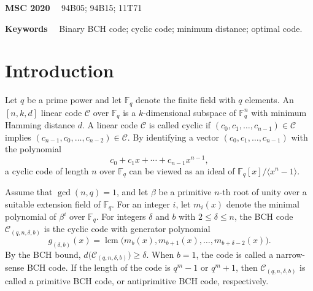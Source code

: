 \documentclass[12pt,draftcls,journal,onecolumn]{IEEEtran}
\begin{document}
\textbf{MSC 2020} \ \ 94B05; 94B15; 11T71

\textbf{Keywords} \ \  Binary BCH code; cyclic code; minimum distance; optimal code.



%
\IEEEpeerreviewmaketitle


\section{Introduction}

Let $q$ be a prime power and let $\mathbb{F}_q$ denote the finite field with $q$ elements. An
$[n,k,d]$ linear code $\mathcal{C}$ over $\mathbb{F}_q$ is a $k$-dimensional subspace of
$\mathbb{F}_q^n$ with minimum Hamming distance $d$. A linear code $\mathcal{C}$ is called cyclic if
$
(c_0,c_1,\ldots,c_{n-1})\in \mathcal{C}
$
implies
$
(c_{n-1},c_0,\ldots,c_{n-2})\in \mathcal{C}.
$
By identifying a vector $(c_0,c_1,\ldots,c_{n-1})$ with the polynomial
\[
c_0+c_1x+\cdots+c_{n-1}x^{n-1},
\]
a cyclic code of length $n$ over $\mathbb{F}_q$ can be viewed as an ideal of
$\mathbb{F}_q[x]/\langle x^n-1\rangle$.

Assume that $\gcd(n,q)=1$, and let $\beta$ be a primitive $n$-th root of unity over a suitable
extension field of $\mathbb{F}_q$. For an integer $i$, let $m_i(x)$ denote the minimal polynomial
of $\beta^i$ over $\mathbb{F}_q$. For integers $\delta$ and $b$ with $2\leq \delta\leq n$, the BCH
code $\mathcal{C}_{(q,n,\delta,b)}$ is the cyclic code with generator polynomial
\[
g_{(\delta,b)}(x)
=
\operatorname{lcm}
\bigl(
m_b(x),m_{b+1}(x),\ldots,m_{b+\delta-2}(x)
\bigr).
\]
By the BCH bound,
$d\bigl(\mathcal{C}_{(q,n,\delta,b)}\bigr)\geq \delta.$ When $b=1$, the code is called a narrow-sense BCH code. If the length of the code is \( q^m - 1 \) or \( q^m + 1 \),
then $\mathcal{C}_{(q,n,\delta,b)}$ is called a primitive BCH code, or antiprimitive BCH code, respectively.
\end{document}
